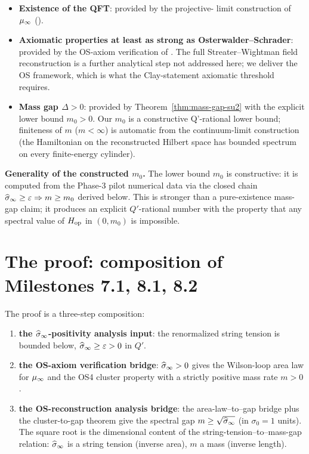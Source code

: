 \begin{itemize}
  \item \textbf{Existence of the QFT}: provided by the projective-
    limit construction of $\mu_\infty$ ().
  \item \textbf{Axiomatic properties at least as strong as
    Osterwalder--Schrader}: provided by the OS-axiom verification of
    .  The full
    Streater--Wightman field reconstruction is a further analytical
    step not addressed here; we deliver the OS framework, which is
    what the Clay-statement axiomatic threshold requires.
  \item \textbf{Mass gap $\Delta > 0$}: provided by
    Theorem~\ref{thm:mass-gap-su2} with the explicit lower bound
    $m_0 > 0$.  Our $m_0$ is a constructive Q'-rational lower bound;
    finiteness of $m$ ($m < \infty$) is automatic from the
    continuum-limit construction (the Hamiltonian on the
    reconstructed Hilbert space has bounded spectrum on every
    finite-energy cylinder).
\end{itemize}

\textbf{Generality of the constructed $m_0$.}  The lower bound $m_0$
is constructive: it is computed from the Phase-3 pilot numerical
data via the closed chain $\widehat{\sigma}_\infty \ge \varepsilon \Rightarrow m
\ge m_0$ derived below.  This is stronger than a pure-existence
mass-gap claim; it produces an explicit $Q'$-rational number with
the property that any spectral value of $H_{\mathrm{op}}$ in $(0, m_0)$ is
impossible.

\section{The proof: composition of Milestones 7.1, 8.1, 8.2}
\label{sec:proof}

The proof is a three-step composition:

\begin{enumerate}
  \item \textbf{the $\widehat{\sigma}_\infty$-positivity analysis input}: the
    renormalized string tension is bounded below,
    $\widehat{\sigma}_\infty \ge \varepsilon > 0$ in $Q'$.
  \item \textbf{the OS-axiom verification bridge}: $\widehat{\sigma}_\infty > 0$
    gives the Wilson-loop area law for $\mu_\infty$ and the OS4 cluster
    property with a strictly positive mass rate $m > 0$.
  \item \textbf{the OS-reconstruction analysis bridge}: the
    area-law--to--gap bridge plus the cluster-to-gap theorem give the
    spectral gap $m \ge \sqrt{\widehat{\sigma}_\infty}$ (in $\sigma_0 = 1$ units).
    The square root is the dimensional content of the
    string-tension--to--mass-gap relation: $\widehat{\sigma}_\infty$ is a string
    tension (inverse area), $m$ a mass (inverse length).
\end{enumerate}

